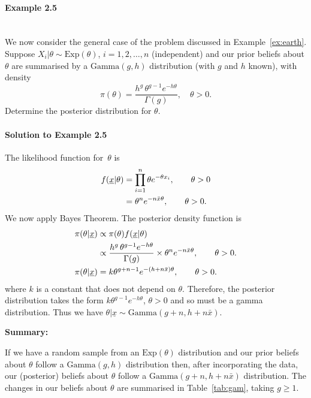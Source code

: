 \newpage
\paragraph{Example 2.5}{~\\
  We now consider the general case of the problem discussed in Example~\ref{ex:earth}.  Suppose $X_i|\theta\sim \text{Exp}(\theta)$, $i=1,2,\ldots,n$ (independent) and our prior beliefs about $\theta$ are summarised by a $\text{Gamma}(g,h)$ distribution (with $g$ and $h$ known), with density
\begin{equation}
\label{eq:p6}
\pi(\theta)=\frac{h^g\,\theta^{g-1}e^{-h\theta}}{\Gamma(g)}, 
\quad\theta>0.
\end{equation}
Determine the posterior distribution for $\theta$.

\paragraph{Solution to Example 2.5}{
    
    The likelihood function for~$\theta$ is
    \begin{align}
    \label{eq:p7}
   f(\underline{x}|\theta)&=\prod_{i=1}^n \theta e^{-\theta x_i}, 
    \quad\quad\theta>0 \notag \\
    &= \theta^n e^{-n\bar x\theta}, \quad\quad\theta>0. 
    \end{align}
    We now apply Bayes Theorem. The posterior density function is
    \begin{align}
    \pi(\theta|\underline{x})&\propto\pi(\theta)f(\underline{x}|\theta) \notag \\
    &\propto\frac{h^g\,\theta^{g-1}e^{-h\theta}}{\Gamma(g)}\times
    \theta^n e^{-n\bar x\theta},\quad\quad\theta>0. \notag \\
    \pi(\theta|\underline{x})
    \label{eq:p8}
    &=k\theta^{g+n-1}e^{-(h+n\bar x)\theta},\quad\quad\theta>0.
    \end{align}
    where $k$ is a constant that does not depend on $\theta$. Therefore, the posterior distribution takes the form $k\theta^{g-1}e^{-h\theta}$, $\theta>0$ and so must be a gamma distribution. Thus we have $\theta|\underline{x}\sim \text{Gamma}(g+n,h+n\bar x)$.
    
    
    
}

\newpage

\textbf{Summary:} 

If we have a random sample from an $\text{Exp}(\theta)$ distribution and our prior beliefs about $\theta$ follow a $\text{Gamma}(g,h)$ distribution then, after incorporating the data, our (posterior) beliefs about $\theta$ follow a $\text{Gamma}(g+n,h+n\bar x)$ distribution.
The changes in our beliefs about $\theta$ are summarised in Table~\ref{tab:gam}, taking $g\geq 1$.
\begin{table}[!h]
\bigskip


\end{table}}
